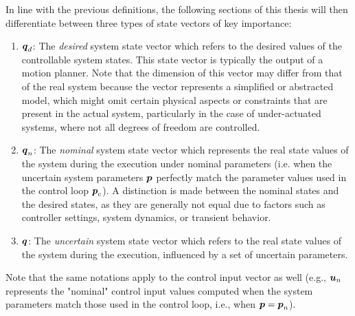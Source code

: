 In line with the previous definitions, the following sections of this thesis will then differentiate between three types of state vectors of key importance:
\begin{enumerate}
  \item $\boldsymbol{q}_d$: The \emph{desired} system state vector which refers to the desired values of the controllable system states. This state vector is typically the output of a motion planner. Note that the dimension of this vector may differ from that of the real system because the vector represents a simplified or abstracted model, which might omit certain physical aspects or constraints that are present in the actual system, particularly in the case of under-actuated systems, where not all degrees of freedom are controlled.
  \item $\boldsymbol{q}_n$: The \emph{nominal} system state vector which represents the real state values of the system during the execution under nominal parameters (i.e. when the uncertain system parameters $\boldsymbol{p}$ perfectly match the parameter values used in the control loop $\boldsymbol{p}_c$). A distinction is made between the nominal states and the desired states, as they are generally not equal due to factors such as controller settings, system dynamics, or transient behavior.
  \item $\boldsymbol{q}$: The \emph{uncertain} system state vector which refers to the real state values of the system during the execution, influenced by a set of uncertain parameters.
\end{enumerate}
Note that the same notations apply to the control input vector as well (e.g., $\boldsymbol{u}_n$ represents the "nominal" control input values computed when the system parameters match those used in the control loop, i.e., when $\boldsymbol{p}=\boldsymbol{p}_n$).

